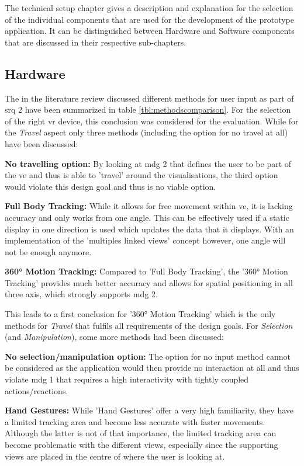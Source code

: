 The technical setup chapter gives a description and explanation for the selection of the individual components that are used for the development of the prototype application. It can be distinguished between Hardware and Software components that are discussed in their respective sub-chapters.


\subsection{Hardware}

The in the literature review discussed different methods for user input as part of \gls{srq} 2 have been summarized in table \ref{tbl:methodscomparison}. For the selection of the right \gls{vr} device, this conclusion was considered for the evaluation. While for the \textit{Travel} aspect only three methods (including the option for no travel at all) have been discussed:

\textbf{No travelling option:}
By looking at \gls{mdg} 2 that defines the user to be part of the \gls{ve} and thus is able to 'travel' around the visualisations, the third option would violate this design goal and thus is no viable option.

\textbf{Full Body Tracking:}
While it allows for free movement within \gls{ve}, it is lacking accuracy and only works from one angle. This can be effectively used if a static display in one direction is used which updates the data that it displays. With an implementation of the 'multiples linked views' concept however, one angle will not be enough anymore.

\textbf{360° Motion Tracking:}
Compared to 'Full Body Tracking', the '360° Motion Tracking' provides much better accuracy and allows for spatial positioning in all three axis, which strongly supports \gls{mdg} 2.


This leads to a first conclusion for '360° Motion Tracking' which is the only methods for \textit{Travel} that fulfils all requirements of the design goals. For \textit{Selection} (and \textit{Manipulation}), some more methods had been discussed:

\textbf{No selection/manipulation option:}
The option for no input method cannot be considered as the application would then provide no interaction at all and thus violate \gls{mdg} 1 that requires a high interactivity with tightly coupled actions/reactions.

\textbf{Hand Gestures:}
While 'Hand Gestures' offer a very high familiarity, they have a limited tracking area and become less accurate with faster movements. Although the latter is not of that importance, the limited tracking area can become problematic with the different views, especially since the supporting views are placed in the centre of where the user is looking at.

